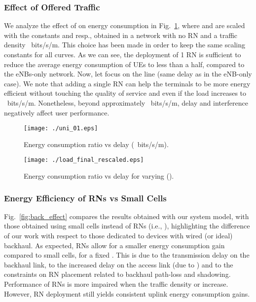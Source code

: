 \documentclass[draftcls,onecolumn]{IEEEtran}
\theoremstyle{plain}
\theoremstyle{definition}
\begin{document}
\subsubsection{Effect of Offered Traffic}
We analyze the effect of  on energy consumption in Fig.~\ref{fig:load_final}, where  and  are scaled with the constants  and  resp., obtained in a network with no RN and a traffic density ~bits/s/m. This choice has been made in order to keep the same scaling constants for all curves. 
As we can see, the deployment of 1 RN is sufficient to reduce the average energy consumption of UEs to less than a half, compared to the eNBs-only network.
Now, let focus on the line  (same delay as in the eNB-only case). We note that adding a single RN can help the terminals to be more energy efficient without touching the quality of service and even if the load increases to ~bits/s/m. Nonetheless, beyond approximately ~bits/s/m, delay and interference negatively affect user performance. 



\begin{figure}
\centering
\begin{minipage}{.47\textwidth}
\centering
\texttt{[image: ./uni\_01.eps]} 
\caption{Energy consumption ratio  vs delay  (~bits/s/m).}\label{fig:uni_01}
\end{minipage}\hfill
\begin{minipage}{.47\textwidth}
\centering
\texttt{[image: ./load\_final\_rescaled.eps]}
\caption{Energy consumption ratio  vs delay  for varying  ().}
\label{fig:load_final}
\end{minipage}
\end{figure}


\subsubsection{Energy Efficiency of RNs vs Small Cells}
Fig.~\ref{fig:back_effect} compares the results obtained with our system model, with those obtained using small cells instead of RNs (i.e., ), highlighting the difference of our work with respect to those dedicated to devices with wired (or ideal) backhaul. As expected, RNs allow for a smaller energy consumption gain compared to small cells, for a fixed . This is due to the transmission delay on the backhaul link, to the increased delay on the access link (due to ) and to the constraints on RN placement related to backhaul path-loss and shadowing. Performance of RNs is more impaired when the traffic density or  increase. 
However, RN deployment still yields consistent uplink energy consumption gains.     
\end{document}
